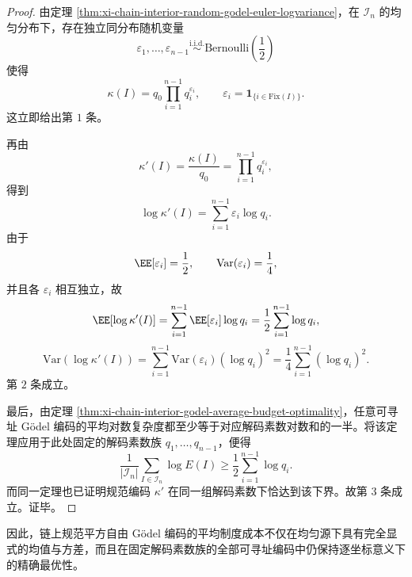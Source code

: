 \begin{proof}
由定理 \ref{thm:xi-chain-interior-random-godel-euler-logvariance}，在 \(\mathcal I_n\) 的均匀分布下，存在独立同分布随机变量
\[
\varepsilon_1,\dots,\varepsilon_{n-1}
\stackrel{\mathrm{i.i.d.}}{\sim}
\mathrm{Bernoulli}\!\left(\frac12\right)
\]
使得
\[
\kappa(I)=q_0\prod_{i=1}^{n-1}q_i^{\varepsilon_i},
\qquad
\varepsilon_i=\mathbf 1_{\{i\in \mathrm{Fix}(I)\}}.
\]
这立即给出第 \(1\) 条。

再由
\[
\kappa'(I)=\frac{\kappa(I)}{q_0}
=
\prod_{i=1}^{n-1}q_i^{\varepsilon_i},
\]
得到
\[
\log \kappa'(I)=\sum_{i=1}^{n-1}\varepsilon_i\log q_i.
\]
由于
\[
\EE[\varepsilon_i]=\frac12,
\qquad
\mathrm{Var}(\varepsilon_i)=\frac14,
\]
并且各 \(\varepsilon_i\) 相互独立，故
\[
\EE[\log \kappa'(I)]
=
\sum_{i=1}^{n-1}\EE[\varepsilon_i]\log q_i
=
\frac12\sum_{i=1}^{n-1}\log q_i,
\]
\[
\mathrm{Var}(\log \kappa'(I))
=
\sum_{i=1}^{n-1}\mathrm{Var}(\varepsilon_i)(\log q_i)^2
=
\frac14\sum_{i=1}^{n-1}(\log q_i)^2.
\]
第 \(2\) 条成立。

最后，由定理 \ref{thm:xi-chain-interior-godel-average-budget-optimality}，任意可寻址 Gödel 编码的平均对数复杂度都至少等于对应解码素数对数和的一半。将该定理应用于此处固定的解码素数族 \(q_1,\dots,q_{n-1}\)，便得
\[
\frac{1}{|\mathcal I_n|}
\sum_{I\in\mathcal I_n}\log E(I)
\ge
\frac12\sum_{i=1}^{n-1}\log q_i.
\]
而同一定理也已证明规范编码 \(\kappa'\) 在同一组解码素数下恰达到该下界。故第 \(3\) 条成立。证毕。
\end{proof}

\noindent
因此，链上规范平方自由 Gödel 编码的平均制度成本不仅在均匀源下具有完全显式的均值与方差，而且在固定解码素数族的全部可寻址编码中仍保持逐坐标意义下的精确最优性。

\endinput

